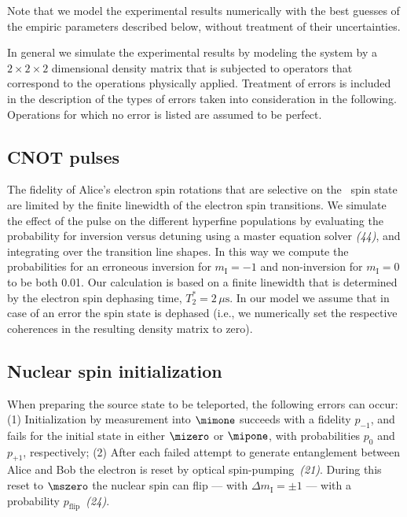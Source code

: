 Note that we model the experimental results numerically with the best guesses of the empiric parameters described below, without treatment of their uncertainties.

In general we simulate the experimental results by modeling the system by a $2\times 2 \times 2$ dimensional density matrix that is subjected to operators that correspond to the operations physically applied. Treatment of errors is included in the description of the types of errors taken into consideration in the following. Operations for which no error is listed are assumed to be perfect.

\subsection{CNOT pulses}

The fidelity of Alice's electron spin rotations that are selective on the \nfourteen\ spin state are limited by the finite linewidth of the electron spin transitions. We simulate the effect of the pulse on the different hyperfine populations by evaluating the probability for inversion versus detuning using a master equation solver {\em (44)}, %
and integrating over the transition line shapes. In this way we compute the probabilities for an erroneous inversion for $m_\mathrm I = -1$ and non-inversion for $m_\mathrm I = 0$ to be both 0.01. Our calculation is based on a finite linewidth that is determined by the electron spin dephasing time, $T_2^* = 2\,\mu\mathrm s$. In our model we assume that in case of an error the spin state is dephased (i.e., we numerically set the respective coherences in the resulting density matrix to zero).

\subsection{Nuclear spin initialization}

When preparing the source state to be teleported, the following errors can occur: (1) Initialization by measurement into $\mimone$ succeeds with a fidelity $p_{-1}$, and fails for the initial state in either $\mizero$ or $\mipone$, with probabilities $p_0$ and $p_{+1}$, respectively; (2) After each failed attempt to generate entanglement between Alice and Bob the electron is reset by optical spin-pumping~{\em (21)}. %
During this reset to $\mszero$ the nuclear spin can flip --- with $\Delta m_\mathrm I = \pm 1$ --- with a probability $p_\text{flip}$~{\em (24)}. %


